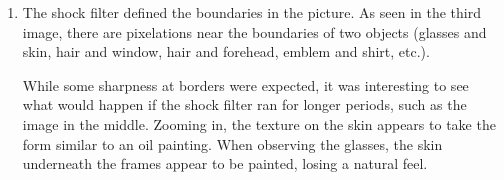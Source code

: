 \documentclass{article}
\begin{document}
\begin{enumerate}
  \item The shock filter defined the boundaries in the picture. As seen in the third image, there are pixelations near the boundaries of two objects (glasses and skin, hair and window, hair and forehead, emblem and shirt, etc.).

  While some sharpness at borders were expected, it was interesting to see what would happen if the shock filter ran for longer periods, such as the image in the middle. Zooming in, the texture on the skin appears to take the form similar to an oil painting. When observing the glasses, the skin underneath the frames appear to be painted, losing a natural feel.
\end{enumerate}
\end{document}
